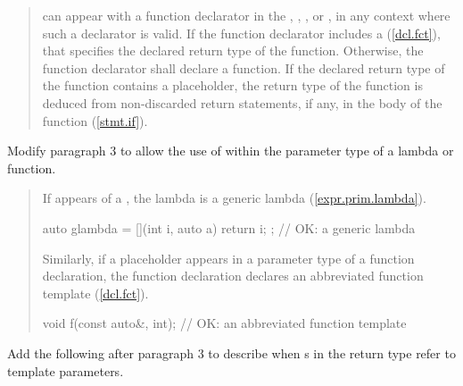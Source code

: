 \begin{quote}
\pnum
{} can appear with a function 
declarator in the , ,
, or , 
in any context where such a declarator is valid. 
% 
If the function declarator includes a  
(\ref{dcl.fct}), that  specifies the declared 
return type of the function. Otherwise, the function declarator shall declare
a function.
%
If the declared return type of the function contains a placeholder,
the return type of the function is deduced from non-discarded return statements,
if any, in the body of the function (\ref{stmt.if}).
%
\end{quote}


Modify paragraph 3 to allow the use of  within the 
parameter type of a lambda or function.

\begin{quote}
\pnum
If  
appears  
 of a , the lambda 
is a generic lambda
(\ref{expr.prim.lambda}).
%
\enterexample
\begin{codeblock}
auto glambda = [](int i, auto a) { return i; }; // OK: a generic lambda
\end{codeblock}
\exitexample
%
\begin{addedblock}
Similarly, if a placeholder appears in a parameter type of a function 
declaration, the function declaration declares an abbreviated function 
template (\ref{dcl.fct}).
%
\enterexample
\begin{codeblock}
void f(const auto&, int); // OK: an abbreviated function template
\end{codeblock}
\exitexample
\end{addedblock}
\end{quote}


Add the following after paragraph 3 to describe when 
s in the return type 
refer to template parameters.

